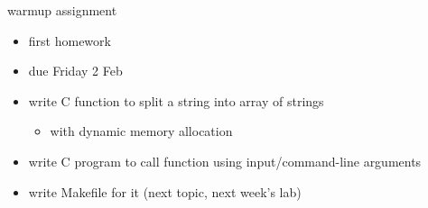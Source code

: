 \begin{frame}{warmup assignment}
\begin{itemize}
\item first homework
\item due Friday 2 Feb
\vspace{.5cm}
\item write C function to split a string into array of strings
    \begin{itemize}
    \item with dynamic memory allocation
    \end{itemize}
\item write C program to call function using input/command-line arguments
\item write Makefile for it (next topic, next week's lab)
\end{itemize}
\end{frame}
